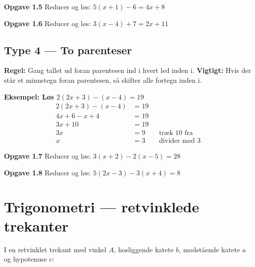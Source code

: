 \documentclass[11pt,a4paper]{article}
\begin{document}
\begin{opgavebox}
\textbf{Opgave 1.5} \quad Reducer og løs: \quad $5(x + 1) - 6 = 4x + 8$
\end{opgavebox}

\begin{opgavebox}
\textbf{Opgave 1.6} \quad Reducer og løs: \quad $3(x - 4) + 7 = 2x + 11$
\end{opgavebox}

\subsection*{Type 4 --- To parenteser}

\begin{regelbox}
\textbf{Regel:} Gang tallet ud foran parentesen ind i hvert led inden i.
\textbf{Vigtigt:} Hvis der står et minustegn foran parentesen, så skifter
alle fortegn inden i.
\end{regelbox}

\textbf{Eksempel: Løs $2(2x + 3) - (x - 4) = 19$}
\begin{align*}
  2(2x+3) - (x-4) &= 19\\
  4x + 6 - x + 4  &= 19\\
  3x + 10         &= 19\\
  3x              &= 9 \qquad\text{træk $10$ fra}\\
  x               &= 3 \qquad\text{divider med $3$}
\end{align*}

\begin{opgavebox}
\textbf{Opgave 1.7} \quad Reducer og løs: \quad $3(x + 2) - 2(x - 5) = 28$
\end{opgavebox}

\begin{opgavebox}
\textbf{Opgave 1.8} \quad Reducer og løs: \quad $5(2x - 3) - 3(x + 4) = 8$
\end{opgavebox}

\newpage
\section{Trigonometri --- retvinklede trekanter}

\noindent
I en retvinklet trekant med vinkel $A$, hosliggende katete $b$, modstående
katete $a$ og hypotenuse $c$:
\end{document}
